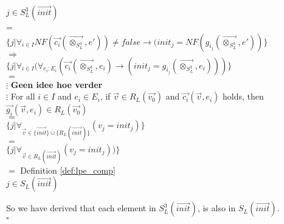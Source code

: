 \documentclass[a4paper,10pt]{article}
\theoremstyle{plain}
\theoremstyle{definition}
\newcommand{\ovr}{\overrightarrow}
\newcommand{\tb}{\textbf}
\newcommand{\sq}{$\square$}
\begin{document}
\begin{defn}
\begin{tabbing}
\> \> $j \in S_L^3(\ovr{init})$\\
\> = \> \> \\
\> \> $\lbrace j \vert \forall_{i \in I} NF(\ovr{c_i}( \ovr{\otimes_{S_L^3}}, e')) \neq false \rightarrow (init_j = NF(g_{i_j} (\ovr{\otimes_{S_L^3}}, e' ))  \rbrace$\\
\> $\Rightarrow$ \> \> \\
\> \> $\lbrace j \vert \forall_{i \in I} (\forall_{e_i:E_i} (\ovr{c_i}( \ovr{\otimes_{S_L^3}}, e_i) \rightarrow (init_j = g_{i_j} (\ovr{\otimes_{S_L^3}}, e_i )))  \rbrace$\\
\> $=$ \> \\
$\vdots$ \tb{Geen idee hoe verder} \\ 
$\vdots$\> \> \> For all $i \in I$ and $e_i \in E_i$, if $\ovr{v} \in R_L(\ovr{v_0})$ and $\ovr{c_i}(\ovr{v}, e_i)$ holds, then $\ovr{g_i}(\ovr{v}, e_i) \in R_L(\ovr{v_0})$ \\
\> $=$ \> \\
\> \> $\lbrace j \vert \forall_{\ovr{v} \in \lbrace \ovr{init} \rbrace \cup \lbrace R_L(\ovr{init})\rbrace }(v_j = init_j) \rbrace$ \\
\> $=$ \> \\
\> \> $\lbrace j \vert \forall_{\ovr{v} \in R_L(\ovr{init})} (v_j = init_j)) \rbrace$\\
\> $=$ \> \>Definition \ref{def:lpe_comp}\\
\> \> $j \in S_L(\ovr{init})$

\end{tabbing}
So we have derived that each element in $S_L^3(\ovr{init})$, is also in $S_L(\ovr{init})$.
\\ \sq
\end{defn}
\end{document}
